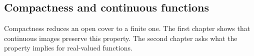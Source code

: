 \documentclass[envcountsect]{svmono}
\begin{document}
\hypersetup{pageanchor=false}
\date{Updated on \today.}
\maketitle
\frontmatter
\hypersetup{pageanchor=true}

\tableofcontents
\mainmatter
\begin{partbacktext}
\part{Compactness and continuous functions}
\noindent
Compactness reduces an open cover to a finite one. The first
chapter shows that continuous images preserve this property.
The second chapter asks what the property implies for real-valued
functions.
\end{partbacktext}


\backmatter
\printindex
\printbibliography[heading=bibintoc]
\end{document}
